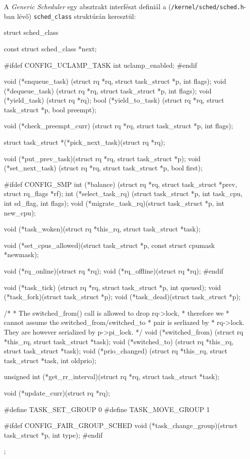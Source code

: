 A \textit{Generic Scheduler} egy absztrakt interfészt definiál a (\texttt{/kernel/sched/sched.h}-ban lévő) \texttt{sched\_class} struktúrán keresztül:
\begin{cpp}
struct sched_class {
	const struct sched_class *next;

#ifdef CONFIG_UCLAMP_TASK
	int uclamp_enabled;
#endif

	void (*enqueue_task)
		(struct rq *rq, struct task_struct *p, int flags);
	void (*dequeue_task)
		(struct rq *rq, struct task_struct *p, int flags);
	void (*yield_task)   (struct rq *rq);
	bool (*yield_to_task)
		(struct rq *rq, struct task_struct *p, bool preempt);

	void (*check_preempt_curr)
		(struct rq *rq, struct task_struct *p, int flags);

	struct task_struct *(*pick_next_task)(struct rq *rq);

	void (*put_prev_task)(struct rq *rq, struct task_struct *p);
	void (*set_next_task)
		(struct rq *rq, struct task_struct *p, bool first);

#ifdef CONFIG_SMP
	int (*balance)
	  (struct rq *rq, struct task_struct *prev, struct rq_flags *rf);
	int  (*select_task_rq)
	  (struct task_struct *p, int task_cpu, int sd_flag, int flags);
	void (*migrate_task_rq)(struct task_struct *p, int new_cpu);

	void (*task_woken)(struct rq *this_rq, struct task_struct *task);

	void (*set_cpus_allowed)(struct task_struct *p,
				 const struct cpumask *newmask);

	void (*rq_online)(struct rq *rq);
	void (*rq_offline)(struct rq *rq);
#endif

	void (*task_tick)
		(struct rq *rq, struct task_struct *p, int queued);
	void (*task_fork)(struct task_struct *p);
	void (*task_dead)(struct task_struct *p);

	/*
	 * The switched_from() call is allowed to drop rq->lock, 
	 * therefore we
	 * cannot assume the switched_from/switched_to 
	 * pair is serliazed by
	 * rq->lock. They are however serialized by p->pi_lock.
	 */
	void (*switched_from)
		(struct rq *this_rq, struct task_struct *task);
	void (*switched_to) 
		(struct rq *this_rq, struct task_struct *task);
	void (*prio_changed)
		(struct rq *this_rq, struct task_struct *task,
			      int oldprio);

	unsigned int (*get_rr_interval)(struct rq *rq,
					struct task_struct *task);

	void (*update_curr)(struct rq *rq);

#define TASK_SET_GROUP		0
#define TASK_MOVE_GROUP		1

#ifdef CONFIG_FAIR_GROUP_SCHED
	void (*task_change_group)(struct task_struct *p, int type);
#endif
};

\end{cpp}
 
